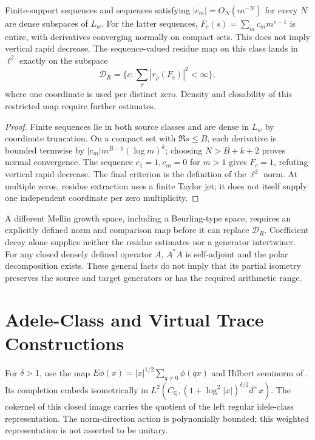 \begin{proposition}
\label{v4-arith:w9-r4:prop:candidate-domains}
Finite-support sequences and sequences satisfying
\(|c_m|=O_N(m^{-N})\) for every \(N\) are dense subspaces of
\(L_w\). For the latter sequences,
\(F_c(s)=\sum_m c_m m^{s-1}\) is entire, with derivatives
converging normally on compact sets. This does not imply vertical
rapid decrease. The sequence-valued residue map on this class
lands in \(\ell^2\) exactly on the subspace
\[
 \mathcal D_R=\{c:\sum_\rho|r_\rho(F_c)|^2<\infty\},
\]
where one coordinate is used per distinct zero.
Density and closability of this restricted map require further
estimates.
\end{proposition}
\begin{proof}
Finite sequences lie in both source classes and are dense in
\(L_w\) by coordinate truncation. On a compact set with
\(\Re s\leq B\), each derivative is bounded termwise by
\(|c_m|m^{B-1}(\log m)^k\); choosing \(N>B+k+2\) proves normal
convergence. The sequence \(c_1=1,c_m=0\) for \(m>1\) gives
\(F_c=1\), refuting vertical rapid decrease. The final criterion
is the definition of the \(\ell^2\) norm. At multiple zeros,
residue extraction uses a finite Taylor jet; it does not itself
supply one independent coordinate per zero multiplicity.
\end{proof}

\begin{remark}
\label{v4-arith:w9-r4:rem:no-domain-gives-SA}
A different Mellin growth space, including a Beurling-type space,
requires an explicitly defined norm and comparison map before it
can replace \(\mathcal D_R\). Coefficient decay alone supplies
neither the residue estimates nor a generator intertwiner.
For any closed densely defined operator \(A\), \(A^*A\) is
self-adjoint and the polar decomposition exists. These general
facts do not imply that its partial isometry preserves the source
and target generators or has the required arithmetic range.
\end{remark}

\section{Adele-Class and Virtual Trace Constructions}
\label{v4-arith:w9-r4:connes-1999}
\label{v4-arith:w9-r4:connes-1999:construction}

\begin{definition}
\label{v4-arith:w9-r4:def:connes-data}
For \(\delta>1\), use the map
\(E\phi(x)=|x|^{1/2}\sum_{q\ne0}\phi(qx)\) and Hilbert seminorm
of .
Its completion embeds isometrically in
\(L^2(C_{\mathbb Q},(1+\log^2|x|)^{\delta/2}d^\times x)\).
The cokernel of this closed image carries the quotient of the
left regular idele-class representation.
The norm-direction action is polynomially bounded; this weighted
representation is not asserted to be unitary.
\end{definition}

